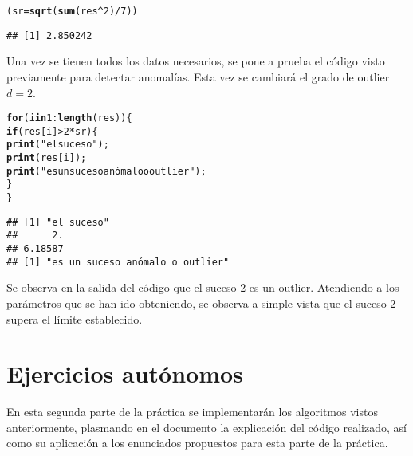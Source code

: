 \documentclass[12pt]{report}\usepackage[]{graphicx}\usepackage[dvipsnames]{xcolor}
\makeatletter
\newcommand{\hlnum}[1]{\textcolor[rgb]{0.686,0.059,0.569}{#1}}%
\newcommand{\hlstr}[1]{\textcolor[rgb]{0.192,0.494,0.8}{#1}}%
\newcommand{\hlopt}[1]{\textcolor[rgb]{0,0,0}{#1}}%
\newcommand{\hlstd}[1]{\textcolor[rgb]{0.345,0.345,0.345}{#1}}%
\newcommand{\hlkwa}[1]{\textcolor[rgb]{0.161,0.373,0.58}{\textbf{#1}}}%
\newcommand{\hlkwb}[1]{\textcolor[rgb]{0.69,0.353,0.396}{#1}}%
\newcommand{\hlkwd}[1]{\textcolor[rgb]{0.737,0.353,0.396}{\textbf{#1}}}%
\newenvironment{kframe}{%
 \def\at@end@of@kframe{}%
 \ifinner\ifhmode%
  \def\at@end@of@kframe{\end{minipage}}%
  \begin{minipage}{\columnwidth}%
 \fi\fi%
 \def\FrameCommand##1{\hskip\@totalleftmargin \hskip-\fboxsep
 \colorbox{shadecolor}{##1}\hskip-\fboxsep
     \hskip-\linewidth \hskip-\@totalleftmargin \hskip\columnwidth}%
 \MakeFramed {\advance\hsize-\width
   \@totalleftmargin\z@ \linewidth\hsize
   \@setminipage}}%
 {\par\unskip\endMakeFramed%
 \at@end@of@kframe}
\newenvironment{knitrout}{}{} %
\makeatother
\begin{document}
\begin{knitrout}
\color{fgcolor}\begin{kframe}
\begin{alltt}
\hlstd{(sr} \hlkwb{=} \hlkwd{sqrt}\hlstd{(}\hlkwd{sum}\hlstd{(res}\hlopt{^}\hlnum{2}\hlstd{)}\hlopt{/}\hlnum{7}\hlstd{))}
\end{alltt}
\begin{verbatim}
## [1] 2.850242
\end{verbatim}
\end{kframe}
\end{knitrout}
	 
	 Una vez se tienen todos los datos necesarios, se pone a prueba el código visto previamente para detectar anomalías. Esta vez se cambiará el grado de outlier $d = 2$.
	 
\begin{knitrout}
\color{fgcolor}\begin{kframe}
\begin{alltt}
\hlkwa{for} \hlstd{(i} \hlkwa{in} \hlnum{1}\hlopt{:}\hlkwd{length}\hlstd{(res))\{}
        \hlkwa{if}\hlstd{(res[i]}\hlopt{>}\hlnum{2}\hlopt{*}\hlstd{sr)\{}
                \hlkwd{print}\hlstd{(}\hlstr{"el suceso"}\hlstd{);}
                \hlkwd{print}\hlstd{(res[i]);}
                \hlkwd{print}\hlstd{(}\hlstr{"es un suceso anómalo o outlier"}\hlstd{);}
                 \hlstd{\}}
\hlstd{\}}
\end{alltt}
\begin{verbatim}
## [1] "el suceso"
##      2. 
## 6.18587 
## [1] "es un suceso anómalo o outlier"
\end{verbatim}
\end{kframe}
\end{knitrout}
	 
	 Se observa en la salida del código que el suceso 2 es un outlier. Atendiendo a los parámetros que se han ido obteniendo, se observa a simple vista que el suceso 2 supera el límite establecido. 
	 
	 \chapter{Ejercicios autónomos}\pagestyle{fancy}
	 
	 En esta segunda parte de la práctica se implementarán los algoritmos vistos anteriormente, plasmando en el documento la explicación del código realizado, así como su aplicación a los enunciados propuestos para esta parte de la práctica.
	 
\end{document}
